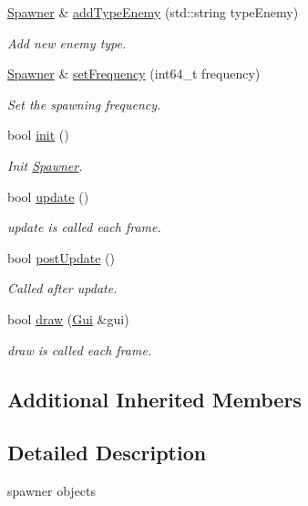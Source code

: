 \begin{DoxyCompactItemize}
\hyperlink{class_spawner}{Spawner} \& \hyperlink{class_spawner_a6ecc83d8c8a0c357772b14a720876689}{add\+Type\+Enemy} (std\+::string type\+Enemy)
\begin{DoxyCompactList}\small\item\em Add new enemy type. \end{DoxyCompactList}\item 
\hyperlink{class_spawner}{Spawner} \& \hyperlink{class_spawner_a42aed9baf9f387c892116b7bcacd820a}{set\+Frequency} (int64\+\_\+t frequency)
\begin{DoxyCompactList}\small\item\em Set the spawning frequency. \end{DoxyCompactList}\item 
bool \hyperlink{class_spawner_a274d6abcfeb55784de07f3c36ae923ce}{init} ()
\begin{DoxyCompactList}\small\item\em Init \hyperlink{class_spawner}{Spawner}. \end{DoxyCompactList}\item 
bool \hyperlink{class_spawner_a9325e76299405d5d74abfb72f4ea2380}{update} ()
\begin{DoxyCompactList}\small\item\em update is called each frame. \end{DoxyCompactList}\item 
bool \hyperlink{class_spawner_ab8a55710ca6e122d975f697a9c7643bc}{post\+Update} ()
\begin{DoxyCompactList}\small\item\em Called after update. \end{DoxyCompactList}\item 
bool \hyperlink{class_spawner_a1532fd875b6a3aacb617b1111b818f01}{draw} (\hyperlink{class_gui}{Gui} \&gui)
\begin{DoxyCompactList}\small\item\em draw is called each frame. \end{DoxyCompactList}\end{DoxyCompactItemize}
\subsection*{Additional Inherited Members}


\subsection{Detailed Description}
spawner objects 

